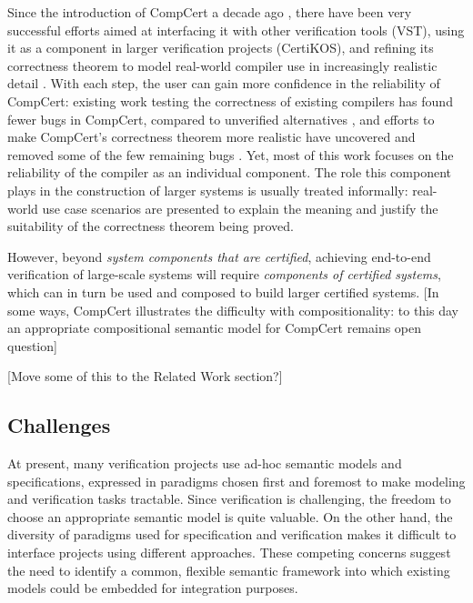\documentclass[acmsmall,timestamp,review,anonymous]{acmart}
\begin{document}
Since the introduction of CompCert a decade ago \cite{compcert},
there have been very successful efforts aimed at
interfacing it with other verification tools (VST),
using it as a component in larger verification projects (CertiKOS),
and refining its correctness theorem
to model real-world compiler use
in increasingly realistic detail
\cite{qompcert,sepcompcert,compcompcert,compcerttso,compcertshm}.
With each step,
the user can gain more confidence in the reliability of CompCert:
existing work testing the correctness of existing compilers
has found fewer bugs in CompCert,
compared to unverified alternatives \cite{csmith},
and efforts to make CompCert's correctness theorem more realistic
have uncovered and removed some of the few remaining bugs \cite{sepcompcert}.
Yet, most of this work
focuses on the reliability of the compiler
as an individual component.
The role this component plays in the construction of larger systems
is usually treated informally:
real-world use case scenarios are presented
to explain the meaning and justify the suitability
of the correctness theorem being proved.

However,
beyond \emph{system components that are certified},
achieving end-to-end verification of large-scale systems
will require \emph{components of certified systems},
which can in turn be used and composed
to build larger certified systems.
[In some ways,
CompCert illustrates the difficulty with compositionality:
to this day an appropriate compositional semantic model
for CompCert remains open question]

[Move some of this to the Related Work section?]


\subsection{Challenges} %

At present, many verification projects
use ad-hoc semantic models and specifications,
expressed in paradigms chosen first and foremost
to make modeling and verification tasks tractable.
Since verification is challenging,
the freedom to choose an appropriate semantic model
is quite valuable.
On the other hand,
the diversity of paradigms used for specification and verification
makes it difficult
to interface projects using different approaches.
These competing concerns
suggest the need to identify a common,
flexible semantic framework
into which existing models could be embedded
for integration purposes.
\end{document}
